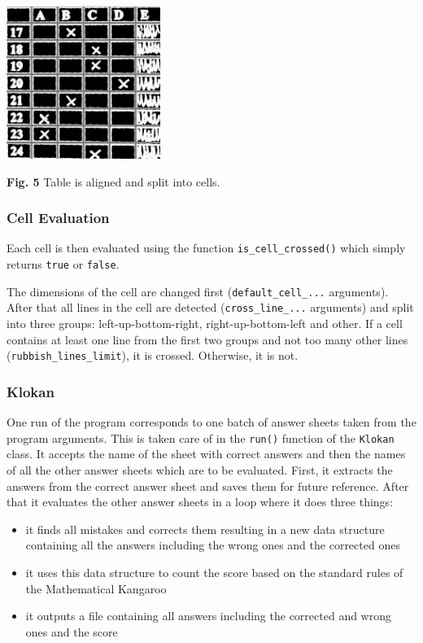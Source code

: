 \documentclass{article}
\begin{document}
{{{		\begin{center}
			\includegraphics[width=5cm]{05.jpg} \par
			{\bf Fig. 5} Table is aligned and split into cells. \par
		\end{center}
		}

		\subsubsection{Cell Evaluation}{
		Each cell is then evaluated using the function \verb+is_cell_crossed()+ which simply returns \verb+true+ or \verb+false+.

		The dimensions of the cell are changed first (\verb+default_cell_...+ arguments). After that all lines in the cell are detected (\verb+cross_line_...+ arguments) and split into three groups: left-up-bottom-right, right-up-bottom-left and other. If a cell contains at least one line from the first two groups and not too many other lines (\verb+rubbish_lines_limit+), it is crossed. Otherwise, it is not.
		}

		\subsubsection{Klokan}{
		One run of the program corresponds to one batch of answer sheets taken from the program arguments. This is taken care of in the \verb+run()+ function of the \verb+Klokan+ class. It accepts the name of the sheet with correct answers and then the names of all the other answer sheets which are to be evaluated. First, it extracts the answers from the correct answer sheet and saves them for future reference. After that it evaluates the other answer sheets in a loop where it does three things:
		\begin{itemize}
			\item it finds all mistakes and corrects them resulting in a new data structure containing all the answers including the wrong ones and the corrected ones
			\item it uses this data structure to count the score based on the standard rules of the Mathematical Kangaroo
			\item it outputs a file containing all answers including the corrected and wrong ones and the score
		\end{itemize}

}}}
\end{document}
